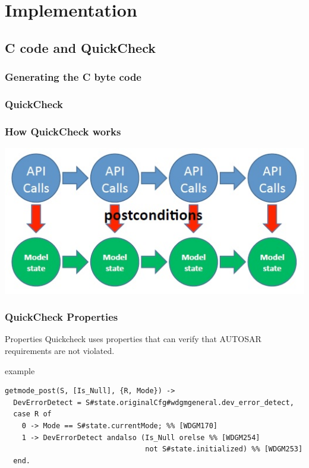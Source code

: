 \documentclass{beamer}
\begin{document}
\section{Implementation}
\subsection{C code and QuickCheck}
\begin{frame}
  \frametitle{Generating the C byte code}
  
\end{frame}

\begin{frame}
        \frametitle{QuickCheck}
\end{frame}

%   

\begin{frame}
  \frametitle{How QuickCheck works}
  \centerline{
    \includegraphics[keepaspectratio, width=0.7\linewidth]{api_calls}
  }
\end{frame}

\newcommand\Fontvi{\fontsize{6}{7.2}\selectfont}
\begin{frame}[fragile]
  \frametitle{QuickCheck Properties}
  \begin{block}{Properties}
    Quickcheck uses properties that can verify that AUTOSAR requirements are not violated.
  \end{block}
  \begin{block}{example}
    \Fontvi
    \begin{lstlisting}[style=erlang]
getmode_post(S, [Is_Null], {R, Mode}) ->
  DevErrorDetect = S#state.originalCfg#wdgmgeneral.dev_error_detect,
  case R of
    0 -> Mode == S#state.currentMode; %% [WDGM170]
    1 -> DevErrorDetect andalso (Is_Null orelse %% [WDGM254]
                                 not S#state.initialized) %% [WDGM253]
  end.
    \end{lstlisting}
  \end{block}
\end{frame}
\end{document}
